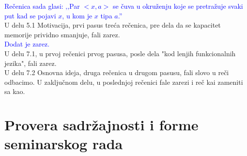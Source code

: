 \documentclass[a4paper]{report}
\newcommand{\odgovor}[1]{\textcolor{blue}{#1}}
\begin{document}
\odgovor{Rečenica sada glasi: ‚‚Par $<x, a>$ se čuva u okruženju koje se pretražuje svaki put kad se pojavi $x$, u kom je $x$ tipa $a$.''}\\

U delu 5.1 Motivacija, prvi pasus treća rečenica, pre dela da se kapacitet memorije prividno smanjuje, fali zarez.\\

\odgovor{Dodat je zarez.}\\

U delu 7.1, u prvoj rečenici prvog pasusa, posle dela "kod lenjih funkcionalnih jezika", fali zarez. \\

U delu 7.2 Osnovna ideja, druga rečenica u drugom pasusu, fali slovo u reči odbacimo.
U zaključnom delu, u poslednjoj rečenici fale zarezi i reč kai zameniti sa kao. \\

\section{Provera sadržajnosti i forme seminarskog rada}
\end{document}
